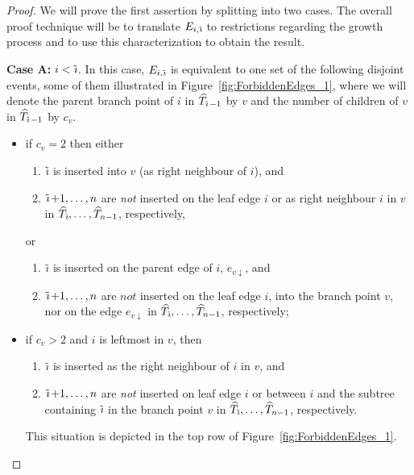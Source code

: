 \documentclass[a4paper, final]{amsart}
\theoremstyle{plain}
\theoremstyle{definition}
\newcommand{\That}[1][T]{\widehat{#1}}
\DeclareMathOperator{\tildei}{\tilde{\textit{\i}}}
\begin{document}
\begin{proof}
    We will prove the first assertion by splitting into two cases.
    The overall proof technique will be to translate $E_{i, \tildei}$ to restrictions regarding the growth process and to use this characterization to obtain the result.

    \textbf{Case A:} $i < \tildei$. In this case, $E_{i, \tildei}$ is equivalent to one set of the following disjoint events, some of them illustrated in Figure~\ref{fig:ForbiddenEdges_1}, where we will denote the parent branch point of $i$ in $\That_{\tildei - 1}$ by $v$ and the number of children of $v$ in $\That_{\tildei - 1}$ by $c_v$.
        \begin{itemize}
          \item if $c_v = 2$ then either
            \begin{enumerate}
              \item $\tildei$ is inserted into $v$ (as right neighbour of $i$), and
              \item $\tildei + 1, \ldots, n$ are \textit{not} inserted on the leaf edge $i$ or as right neighbour $i$ in $v$ in $\That_{\tildei}, \ldots, \That_{n-1}$, respectively,
            \end{enumerate}
            or
            \begin{enumerate}
              \item $\tildei$ is inserted on the parent edge of $i$, $e_{v\downarrow}$, and
              \item $\tildei + 1, \ldots, n$ are $\textit{not}$ inserted on the leaf edge $i$, into the branch point $v$, nor on the edge $e_{v\downarrow}$ in $\That_{\tildei}, \ldots, \That_{n-1}$, respectively;
            \end{enumerate}
          \item if $c_v > 2$ and $i$ is leftmost in $v$, then
            \begin{enumerate}
              \item $\tildei$ is inserted as the right neighbour of $i$ in $v$, and
              \item $\tildei + 1, \ldots, n$ are \textit{not} inserted on leaf edge $i$ or between $i$ and the subtree containing $\tildei$ in the branch point $v$ in $\That_{\tildei}, \ldots, \That_{n-1}$, respectively.
            \end{enumerate}
            This situation is depicted in the top row of Figure~\ref{fig:ForbiddenEdges_1}.

\end{itemize}
\end{proof}
\end{document}
